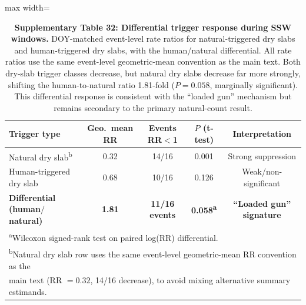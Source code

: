 \documentclass[11pt,letterpaper]{article}
\begin{document}
\begin{table}[htbp]
\centering
\caption{\textbf{Supplementary Table 32: Differential trigger response during SSW windows.} DOY-matched event-level rate ratios for natural-triggered dry slabs and human-triggered dry slabs, with the human/natural differential. All rate ratios use the same event-level geometric-mean convention as the main text. Both dry-slab trigger classes decrease, but natural dry slabs decrease far more strongly, shifting the human-to-natural ratio 1.81-fold ($P = 0.058$, marginally significant). This differential response is consistent with the ``loaded gun'' mechanism but remains secondary to the primary natural-count result.}
\label{tab:trigger_differential}
\small
\begin{adjustbox}{max width=\textwidth}
\begin{tabular}{lcccc}
\toprule
\textbf{Trigger type} & \textbf{Geo.\ mean RR} & \textbf{Events RR$<$1} & \textbf{$P$ (t-test)} & \textbf{Interpretation} \\
\midrule
Natural dry slab\textsuperscript{b} & 0.32 & 14/16 & 0.001 & Strong suppression \\
Human-triggered dry slab & 0.68 & 10/16 & 0.126 & Weak/non-significant \\
\midrule
\textbf{Differential (human$/$natural)} & \textbf{1.81} & \textbf{11/16 events} & \textbf{0.058\textsuperscript{a}} & \textbf{``Loaded gun'' signature} \\
\bottomrule
\multicolumn{5}{l}{\footnotesize \textsuperscript{a}Wilcoxon signed-rank test on paired log(RR) differential.} \\
\multicolumn{5}{l}{\footnotesize \textsuperscript{b}Natural dry slab row uses the same event-level geometric-mean RR convention as the} \\
\multicolumn{5}{l}{\footnotesize main text (RR $= 0.32$, 14/16 decrease), to avoid mixing alternative summary estimands.} \\
\end{tabular}
\end{adjustbox}
\end{table}
\end{document}
